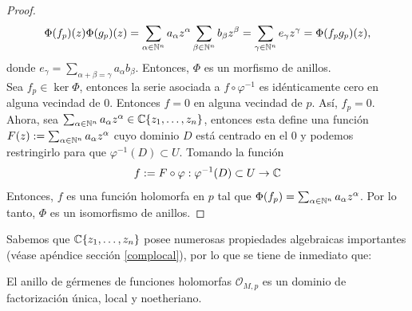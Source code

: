 \begin{proof}
\begin{equation*}
		\Phi(f_p)(z)\Phi(g_p)(z)=\sum_{\alpha\in\mathbb{N}^n} a_\alpha z^{\alpha}\sum_{\beta\in\mathbb{N}^n} b_\beta z^{\beta}=\sum_{\gamma\in\mathbb{N}^n} e_\gamma z^{\gamma}=\Phi(f_pg_p)(z),
	\end{equation*}
	donde $e_\gamma=\sum_{\alpha+\beta=\gamma}a_\alpha b_\beta$. Entonces, $\Phi$ es un morfismo de anillos.\\
	Sea $f_p\in\ker\Phi$, entonces la serie asociada a $f\circ \varphi^{-1}$ es idénticamente cero en alguna vecindad de $0$. Entonces $f=0$ en alguna vecindad de $p$. Así, $f_p=0$.\\
	Ahora, sea $\sum_{\alpha\in\mathbb{N}^n} a_\alpha z^\alpha \in\mathbb{C}\{z_1,\dots,z_n\}$, entonces esta define una función $F(z):=\sum_{\alpha\in\mathbb{N}^n} a_\alpha z^\alpha$ cuyo dominio $D$ está centrado en el $0$ y podemos restringirlo para que $\varphi^{-1}(D)\subset U$. Tomando la función
	\begin{equation*}
		f:=F\circ\varphi:\varphi^{-1}(D)\subset
		U\to \mathbb{C}
	\end{equation*}
	Entonces, $f$ es una función holomorfa en $p$ tal que $\Phi(f_p)=\sum_{\alpha\in\mathbb{N}^n} a_\alpha z^\alpha$. Por lo tanto, $\Phi$ es un isomorfismo de anillos.
\end{proof}

Sabemos que $\mathbb{C}\{z_1,\dots, z_n\}$ posee numerosas propiedades algebraicas importantes (véase apéndice sección \ref{complocal}), por lo que se tiene de inmediato que:

\begin{corollary}\label{dominiolocal}
	El anillo de gérmenes de funciones holomorfas $\mathscr{O}_{M,p}$ es un dominio de factorización única, local y noetheriano.
\end{corollary}